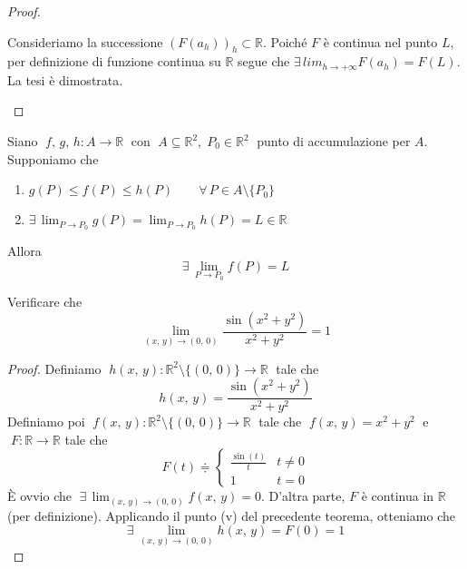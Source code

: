 \begin{proof}
\begin{enumerate}[labelindent=\parindent,leftmargin=*,label=\textnormal{(\roman*)},start=1]
Consideriamo la successione $(F(a_h))_h \subset \mathbb{R}$. Poiché $F$ è continua nel punto $L$, per definizione di funzione continua su $\mathbb{R}$ segue che $\displaystyle \exists \, lim_{h \rightarrow +\infty} F(a_h) = F(L)$. La tesi è dimostrata.
\end{enumerate}
\end{proof}

\begin{cor}
Siano $\; f,\, g,\, h : A \longrightarrow \mathbb{R} \;$ con $\; A \subseteq \mathbb{R}^2, \; P_0 \in \mathbb{R}^2 \;$ punto di accumulazione per $A$. Supponiamo che
\begin{enumerate}[labelindent=\parindent,leftmargin=*,label=\textnormal{(\roman*)},start=1]
\item $g(P) \leq f(P) \leq h(P) \qquad \forall \, P \in A \setminus \lbrace P_0 \rbrace$
\item $\exists \, \displaystyle \lim_{P \rightarrow P_0} g(P) = \lim_{P \rightarrow P_0} h(P) = L \in \mathbb{R}$
\end{enumerate}
Allora
$$\exists \, \lim_{P \rightarrow P_0} f(P) = L$$
\end{cor}

\begin{example}[i]
Verificare che
$$\lim_{(x,\, y) \rightarrow (0,\, 0)} \frac{\sin(x^2+y^2)}{x^2+y^2} = 1$$
\end{example}
\begin{proof}
Definiamo $\; h(x,\, y) : \mathbb{R}^2 \setminus \lbrace (0,\, 0) \rbrace \longrightarrow \mathbb{R} \;$ tale che
$$h(x,\, y) = \frac{\sin(x^2+y^2)}{x^2+y^2}$$
Definiamo poi $\; f(x,\, y) : \mathbb{R}^2 \setminus \lbrace (0,\, 0) \rbrace \longrightarrow \mathbb{R} \;$ tale che $\; f(x,\, y) = x^2 + y^2 \;$ e $\; F : \mathbb{R} \longrightarrow \mathbb{R}$ tale che
$$
F(t) \doteqdot
\begin{cases}
\frac{\sin (t)}{t} & t \neq 0 \\
1 & t = 0
\end{cases}
$$
\`E ovvio che $\; \displaystyle \exists \, \lim_{(x,\, y) \rightarrow (0,\, 0)} f(x,\, y) = 0$. D'altra parte, $F$ è continua in $\mathbb{R}$ (per definizione). Applicando il punto (v) del precedente teorema, otteniamo che
$$\exists \, \lim_{(x,\, y) \rightarrow (0,\, 0)} h(x,\, y) = F(0) = 1$$
\end{proof}

